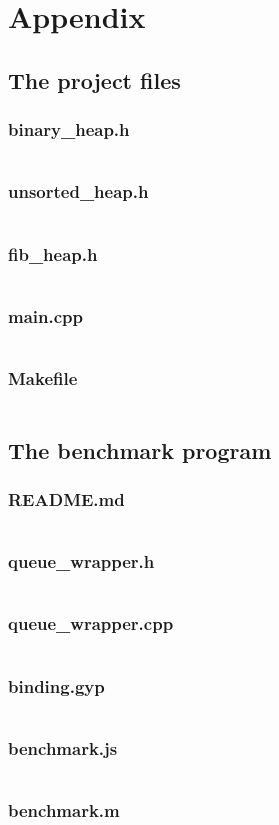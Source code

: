 \documentclass{article}
\begin{document}
\newpage

\section{Appendix}

\subsection{The project files}

\subsubsection{binary\_heap.h}
\inputminted{c++}{../answer/binary_heap.h}
\subsubsection{unsorted\_heap.h}
\inputminted{c++}{../answer/unsorted_heap.h}
\subsubsection{fib\_heap.h}
\inputminted{c++}{../answer/fib_heap.h}
\subsubsection{main.cpp}
\inputminted{c++}{../answer/main.cpp}
\subsubsection{Makefile}
\inputminted{makefile}{../answer/Makefile}


\subsection{The benchmark program}
\subsubsection{README.md}
\inputminted{md}{../benchmark/README.md}
\subsubsection{queue\_wrapper.h}
\inputminted{c++}{../benchmark/queue_wrapper.h}
\subsubsection{queue\_wrapper.cpp}
\inputminted{c++}{../benchmark/queue_wrapper.cpp}
\subsubsection{binding.gyp}
\inputminted{json}{../benchmark/binding.gyp}
\subsubsection{benchmark.js}
\inputminted{javascript}{../benchmark/benchmark.js}
\subsubsection{benchmark.m}
\inputminted{matlab}{../benchmark/benchmark.m}
\end{document}
